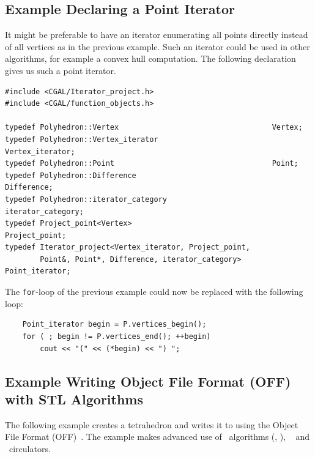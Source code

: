 \subsection{Example Declaring a Point Iterator}

It might be preferable to have an iterator enumerating all points
directly instead of all vertices as in the previous example. Such an 
iterator could be used in other algorithms, for example a convex hull
computation. The following declaration gives us such a point iterator.

\begin{verbatim}
#include <CGAL/Iterator_project.h>
#include <CGAL/function_objects.h>

typedef Polyhedron::Vertex                                   Vertex;
typedef Polyhedron::Vertex_iterator                          Vertex_iterator;
typedef Polyhedron::Point                                    Point;
typedef Polyhedron::Difference                               Difference;
typedef Polyhedron::iterator_category                        iterator_category;
typedef Project_point<Vertex>                                Project_point;
typedef Iterator_project<Vertex_iterator, Project_point,
        Point&, Point*, Difference, iterator_category>       Point_iterator;
\end{verbatim}

The {\tt for}-loop of the previous example could now be replaced with
the following loop:

\begin{verbatim}
    Point_iterator begin = P.vertices_begin();
    for ( ; begin != P.vertices_end(); ++begin)
        cout << "(" << (*begin) << ") ";
\end{verbatim}



\subsection{Example Writing Object File Format (OFF) with STL Algorithms}

The following example creates a tetrahedron and writes it to
 using the Object File Format (OFF)~\cite{p-gmgv15-94}.
The example makes advanced use of \stl\ algorithms (,
), \stl\  and \cgal\ circulators.



